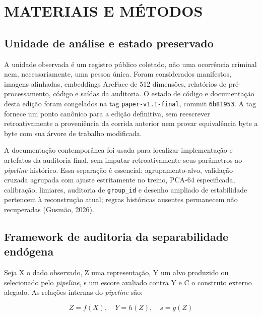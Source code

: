 
\chapter{MATERIAIS E MÉTODOS}

\section{Unidade de análise e estado preservado}

A unidade observada é um registro público coletado, não uma ocorrência criminal nem, necessariamente, uma pessoa única. Foram considerados manifestos, imagens alinhadas, embeddings ArcFace de 512 dimensões, relatórios de pré-processamento, código e saídas da auditoria. O estado de código e documentação desta edição foram congelados na tag  \texttt{paper-v1.1-final}, commit \texttt{6b81953}. A tag fornece um ponto canônico para a edição definitiva, sem reescrever retroativamente a proveniência da corrida anterior nem provar equivalência byte a byte com sua árvore de trabalho modificada.

A documentação contemporânea foi usada para localizar implementação e artefatos da auditoria final, sem imputar retroativamente seus parâmetros ao \emph{pipeline} histórico. Essa separação é essencial: agrupamento-alvo, validação cruzada agrupada com ajuste estritamente no treino, PCA-64 especificada, calibração, limiares, auditoria de \texttt{group\_id} e desenho ampliado de estabilidade pertencem à reconstrução atual; regras históricas ausentes permanecem não recuperadas (Gusmão, 2026).

\section{Framework de auditoria da separabilidade endógena}

Seja X o dado observado, Z uma representação, Y um alvo produzido ou selecionado pelo \emph{pipeline}, s um escore avaliado contra Y e C o construto externo alegado. As relações internas do \emph{pipeline} são:

\begin{equation}\label{eq:pipeline} Z=f(X),\quad Y=h(Z),\quad s=g(Z) \end{equation}

